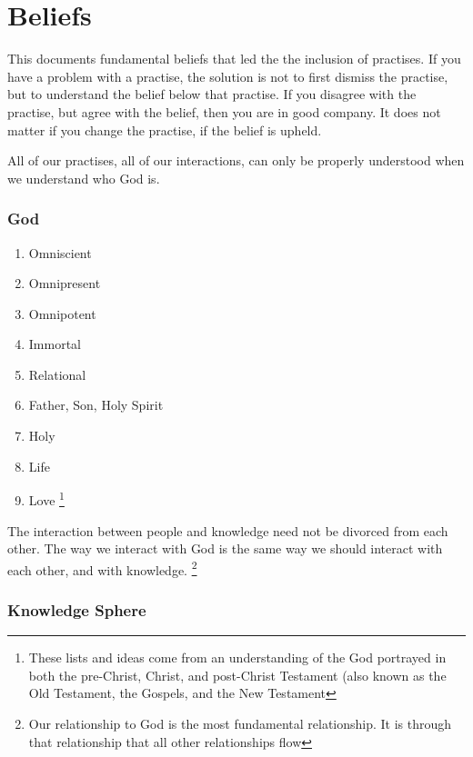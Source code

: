 \documentclass[CSHFoundation.tex]{subfiles}
\begin{document}
\section{Beliefs}

This documents fundamental beliefs that led the the inclusion of practises. If you have a problem with a practise, the solution is not to first dismiss the practise, but to understand the belief below that practise. If you disagree with the practise, but agree with the belief, then you are in good company. It does not matter if you change the practise, if the belief is upheld.

All of our practises, all of our interactions, can only be properly understood when we understand who God is.

\subsubsection{God}

\begin{enumerate}
\item Omniscient
\item Omnipresent
\item Omnipotent
\item Immortal
\item Relational
\item Father, Son, Holy Spirit
\item Holy
\item Life
\item Love \footnote{These lists and ideas come from an understanding of the God portrayed in both the pre-Christ, Christ, and post-Christ Testament (also known as the Old Testament, the Gospels, and the New Testament}
\end{enumerate}

The interaction between people and knowledge need not be divorced from each other. The way we interact with God is the same way we should interact with each other, and with knowledge. \footnote{Our relationship to God is the most fundamental relationship. It is through that relationship that all other relationships flow}



\subsubsection{Knowledge Sphere}
\end{document}
